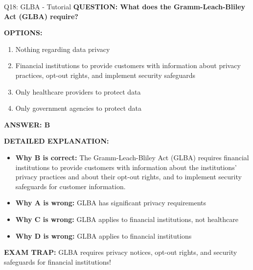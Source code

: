 \documentclass[8pt]{beamer}
\begin{document}
	\begin{frame}{Q18: GLBA - Tutorial}
		\fontsize{6.5}{7.5}\selectfont
		\textbf{QUESTION: What does the Gramm-Leach-Bliley Act (GLBA) require?}
		
		\vspace{0.1cm}
		\textbf{OPTIONS:}
		\begin{enumerate}
			\item Nothing regarding data privacy
			\item Financial institutions to provide customers with information about privacy practices, opt-out rights, and implement security safeguards
			\item Only healthcare providers to protect data
			\item Only government agencies to protect data
		\end{enumerate}
		
		\vspace{0.1cm}
		\textcolor{myblue}{\textbf{ANSWER: B}}
		
		\vspace{0.1cm}
		\textbf{DETAILED EXPLANATION:}
		\begin{itemize}
			\item \textbf{Why B is correct:} The Gramm-Leach-Bliley Act (GLBA) requires financial institutions to provide customers with information about the institutions' privacy practices and about their opt-out rights, and to implement security safeguards for customer information.
			\item \textbf{Why A is wrong:} GLBA has significant privacy requirements
			\item \textbf{Why C is wrong:} GLBA applies to financial institutions, not healthcare
			\item \textbf{Why D is wrong:} GLBA applies to financial institutions
		\end{itemize}
		
		\textcolor{myred}{\textbf{EXAM TRAP:}} GLBA requires \textcolor{myblue}{privacy notices, opt-out rights, and security safeguards} for financial institutions!
	\end{frame}
	
\end{document}
